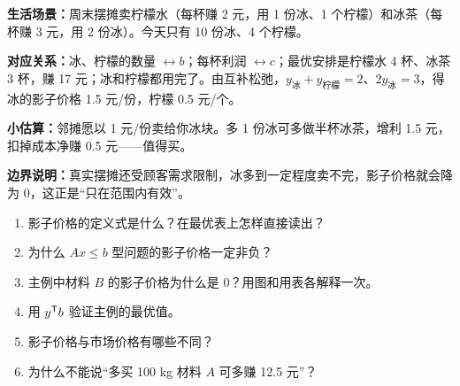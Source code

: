 \begin{lifebox}
\begin{minipage}[t]{0.55\linewidth}
\textbf{生活场景：}周末摆摊卖柠檬水（每杯赚 2 元，用 1 份冰、1 个柠檬）和冰茶（每杯赚 3 元，用 2 份冰）。今天只有 10 份冰、4 个柠檬。\par
\textbf{对应关系：}冰、柠檬的数量 $\leftrightarrow b$；每杯利润 $\leftrightarrow c$；最优安排是柠檬水 4 杯、冰茶 3 杯，赚 17 元；冰和柠檬都用完了。由互补松弛，$y_{\text{冰}}+y_{\text{柠檬}}=2$、$2y_{\text{冰}}=3$，得冰的影子价格 1.5 元/份，柠檬 0.5 元/个。\par
\textbf{小估算：}邻摊愿以 1 元/份卖给你冰块。多 1 份冰可多做半杯冰茶，增利 1.5 元，扣掉成本净赚 0.5 元——值得买。\par
\textbf{边界说明：}真实摆摊还受顾客需求限制，冰多到一定程度卖不完，影子价格就会降为 0，这正是“只在范围内有效”。
\end{minipage}\hfill
\begin{minipage}[t]{0.41\linewidth}\vspace{0pt}\centering
{}
\end{minipage}
\end{lifebox}

\begin{checkbox}
\begin{enumerate}[leftmargin=1.5em]
  \item 影子价格的定义式是什么？在最优表上怎样直接读出？
  \item 为什么 $Ax\le b$ 型问题的影子价格一定非负？
  \item 主例中材料 $B$ 的影子价格为什么是 0？用图和用表各解释一次。
  \item 用 $y^{\mathsf T} b$ 验证主例的最优值。
  \item 影子价格与市场价格有哪些不同？
  \item 为什么不能说“多买 100 kg 材料 $A$ 可多赚 12.5 元”？
\end{enumerate}
\end{checkbox}

